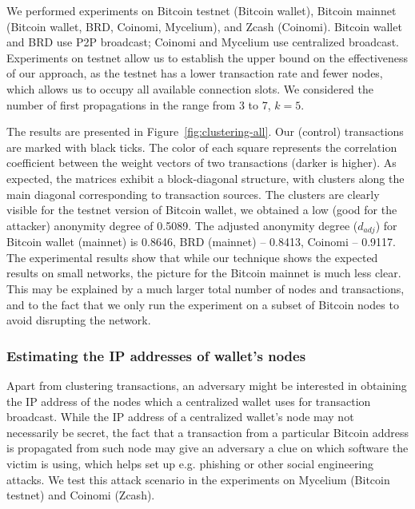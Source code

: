 We performed experiments on Bitcoin testnet (Bitcoin wallet), Bitcoin mainnet (Bitcoin wallet, BRD, Coinomi, Mycelium), and Zcash (Coinomi).
Bitcoin wallet and BRD use P2P broadcast; Coinomi and Mycelium use centralized broadcast.
Experiments on testnet allow us to establish the upper bound on the effectiveness of our approach, as the testnet has a lower transaction rate and fewer nodes, which allows us to occupy all available connection slots.
We considered the number of first propagations in the range from 3 to 7, $k = 5$.

The results are presented in Figure~\ref{fig:clustering-all}.
Our (control) transactions are marked with black ticks.
The color of each square represents the correlation coefficient between the weight vectors of two transactions (darker is higher).
As expected, the matrices exhibit a block-diagonal structure, with clusters along the main diagonal corresponding to transaction sources.
The clusters are clearly visible for the testnet version of Bitcoin wallet, we obtained a low (good for the attacker) anonymity degree of 0.5089.
The adjusted anonymity degree ($d_{adj}$) for Bitcoin wallet (mainnet) is 0.8646, BRD (mainnet) -- 0.8413, Coinomi -- 0.9117.
The experimental results show that while our technique shows the expected results on small networks, the picture for the Bitcoin mainnet is much less clear.
This may be explained by a much larger total number of nodes and transactions, and to the fact that we only run the experiment on a subset of Bitcoin nodes to avoid disrupting the network.

\subsubsection{Estimating the IP addresses of wallet's nodes}

Apart from clustering transactions, an adversary might be interested in obtaining the IP address of the nodes which a centralized wallet uses for transaction broadcast.
While the IP address of a centralized wallet's node may not necessarily be secret, the fact that a transaction from a particular Bitcoin address is propagated from such node may give an adversary a clue on which software the victim is using, which helps set up e.g. phishing or other social engineering attacks.
We test this attack scenario in the experiments on Mycelium (Bitcoin testnet) and Coinomi (Zcash).

